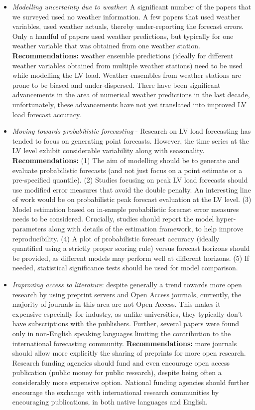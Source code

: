 \begin{itemize}
	\item \textit{Modelling uncertainty due to weather}: A significant number of the papers that we surveyed used no weather information. A few papers that used weather variables, used weather actuals, thereby under-reporting the forecast errors. Only a handful of papers used weather predictions, but typically for one weather variable that was obtained from one weather station. \textbf{Recommendations:} weather ensemble predictions (ideally for different weather variables obtained from multiple weather stations) need to be used while modelling the LV load. Weather ensembles from weather stations are prone to be biased and under-dispersed.  There have been significant advancements in the area of numerical weather predictions in the last decade, unfortunately, these advancements have not yet translated into improved LV load forecast accuracy.  
	
	\item \textit{Moving towards probabilistic forecasting} - Research on LV load forecasting has tended to focus on generating point forecasts. However, the time series at the LV level exhibit considerable variability along with seasonality. \textbf{Recommendations:} (1) The aim of modelling should be to generate and evaluate probabilistic forecasts (and not just focus on a point estimate or a pre-specified quantile). (2) Studies focusing on peak LV load forecasts should use modified error measures that avoid the double penalty. An interesting line of work would be on probabilistic peak forecast evaluation at the LV level. (3) Model estimation based on in-sample probabilistic forecast error measures needs to be considered. Crucially, studies should report the model hyper-parameters along with details of the estimation framework, to help improve reproducibility. (4) A plot of probabilistic forecast accuracy (ideally quantified using a strictly proper scoring rule) versus forecast horizons should be provided, as different models may perform well at different horizons. (5) If needed, statistical significance tests should be used for model comparison.
	
	\item \textit{Improving access to literature}: despite generally a trend towards more open research by using preprint servers and Open Access journals, currently, the majority of journals in this area are not Open Access. This makes it expensive especially for industry, as unlike universities, they typically don't have subscriptions with the publishers. Further, several papers were found only in non-English speaking languages limiting the contribution to the international forecasting community. \textbf{Recommendations:} more journals should allow more explicitly the sharing of preprints for more open research. Research funding agencies should fund and even encourage open access publication (public money for public research), despite being often a considerably more expensive option. National funding agencies should further encourage the exchange with international research communities by encouraging publications, in both native languages and English.
	

\end{itemize}
